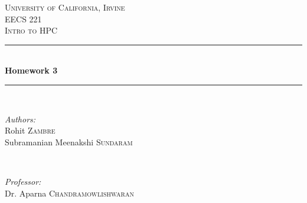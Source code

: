 \documentclass[12pt]{article}
\newcommand{\HRule}{\rule{\linewidth}{0.5mm}} %
\begin{document}
\begin{titlepage}

\center %


\textsc{\LARGE University of California, Irvine}\\[1.5cm] %
\textsc{\Large EECS 221}\\[0.5cm] %
\textsc{\large Intro to HPC}\\[0.5cm] %


\HRule \\[0.4cm]
{ \huge \bfseries Homework 3}\\[0.4cm] %
\HRule \\[1.5cm]


\begin{minipage}{0.4\textwidth}
	\begin{flushleft} \large
		\emph{Authors:}\\
		Rohit \textsc{Zambre}\\ %
		Subramanian Meenakshi \textsc{Sundaram}
	\end{flushleft}
\end{minipage}
~
\begin{minipage}{0.4\textwidth}
	\begin{flushright} \large
		\emph{Professor:} \\
		Dr. Aparna \textsc{Chandramowlishwaran} %
	\end{flushright}
\end{minipage}\\[2cm]



\end{titlepage}
\end{document}
